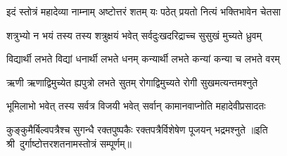 \begin{minipage}{\linewidth}
\centering
{}
\twolineshloka
{इदं स्तोत्रं महादेव्या नाम्नाम् अष्टोत्तरं शतम्}
{यः पठेत् प्रयतो नित्यं भक्तिभावेन चेतसा}
\end{minipage}

\twolineshloka
{शत्रुभ्यो न भयं तस्य तस्य शत्रुक्षयं भवेत्}
{सर्वदुःखदरिद्राच्च सुसुखं मुच्यते ध्रुवम्}

\twolineshloka
{विद्यार्थी लभते विद्यां धनार्थी लभते धनम्}
{कन्यार्थी लभते कन्यां कन्या च लभते वरम्}

\twolineshloka
{ऋणी ऋणाद्विमुच्येत ह्यपुत्रो लभते सुतम्}
{रोगाद्विमुच्यते रोगी सुखमत्यन्तमश्नुते}

\twolineshloka
{भूमिलाभो भवेत् तस्य सर्वत्र विजयी भवेत्}
{सर्वान् कामानवाप्नोति महादेवीप्रसादतः}

\twolineshloka
{कुङ्कुमैर्बिल्वपत्रैश्च सुगन्धै रक्तपुष्पकैः}
{रक्तपत्रैर्विशेषेण पूजयन् भद्रमश्नुते}
॥इति श्री~दुर्गाष्टोत्तरशतनामस्तोत्रं सम्पूर्णम्॥
